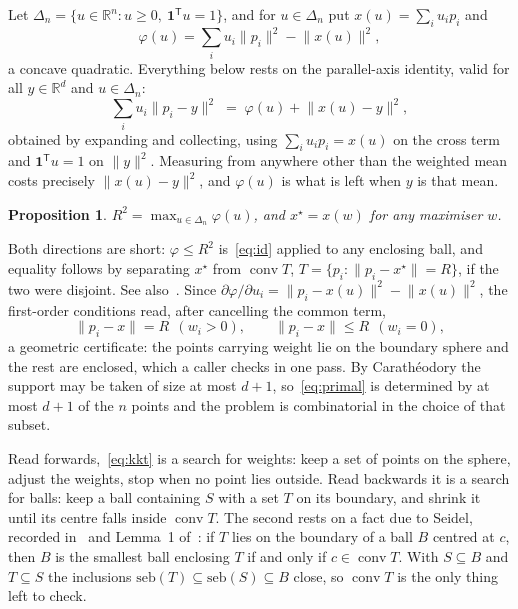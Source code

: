 \documentclass[10pt,a4paper]{article}
\theoremstyle{plain}
\newtheorem{proposition}{Proposition}
\DeclareMathOperator{\conv}{conv}
\newcommand{\R}{\mathbb{R}}
\newcommand{\norm}[1]{\lVert #1 \rVert}
\newcommand{\T}{^{\mathsf{T}}}
\begin{document}
Let $\Delta_n=\{u\in\R^n: u\ge0,\ \mathbf{1}\T u=1\}$, and for $u\in\Delta_n$ put
$x(u)=\sum_i u_ip_i$ and
\begin{equation}
  \label{eq:phi}
  \varphi(u)=\sum_i u_i\norm{p_i}^2-\norm{x(u)}^2 ,
\end{equation}
a concave quadratic. Everything below rests on the parallel-axis identity, valid
for all $y\in\R^d$ and $u\in\Delta_n$:
\begin{equation}
  \label{eq:id}
  \sum_i u_i\norm{p_i-y}^2
    \;=\; \varphi(u)+\norm{x(u)-y}^2 ,
\end{equation}
obtained by expanding and collecting, using $\sum_iu_ip_i=x(u)$ on the cross term
and $\mathbf{1}\T u=1$ on $\norm{y}^2$. Measuring from anywhere other than the
weighted mean costs precisely $\norm{x(u)-y}^2$, and $\varphi(u)$ is what is left
when $y$ is that mean.

\begin{proposition}
  \label{prop:duality}
  $R^2=\max_{u\in\Delta_n}\varphi(u)$, and $x^\star=x(w)$ for any maximiser $w$.
\end{proposition}

\noindent
Both directions are short: $\varphi\le R^2$ is~\eqref{eq:id} applied to any
enclosing ball, and equality follows by separating $x^\star$ from $\conv T$,
$T=\{p_i:\norm{p_i-x^\star}=R\}$, if the two were disjoint. See
also~\cite{gaertner2000}. Since
$\partial\varphi/\partial u_i=\norm{p_i-x(u)}^2-\norm{x(u)}^2$, the first-order
conditions read, after cancelling the common term,
\begin{equation}
  \label{eq:kkt}
  \norm{p_i-x}=R\ \ (w_i>0),\qquad \norm{p_i-x}\le R\ \ (w_i=0),
\end{equation}
a geometric certificate: the points carrying weight lie on the boundary sphere and
the rest are enclosed, which a caller checks in one pass. By Carath\'eodory the
support may be taken of size at most $d+1$, so~\eqref{eq:primal} is determined by
at most $d+1$ of the $n$ points and the problem is combinatorial in the choice of
that subset.

Read forwards,~\eqref{eq:kkt} is a search for weights: keep a set of points on the
sphere, adjust the weights, stop when no point lies outside. Read backwards it is
a search for balls: keep a ball containing $S$ with a set $T$ on its boundary, and
shrink it until its centre falls inside $\conv T$. The second rests on a fact due
to Seidel, recorded in~\cite{gaertner2000} and Lemma~1 of~\cite{fischer2003}: if
$T$ lies on the boundary of a ball $B$ centred at $c$, then $B$ is the smallest
ball enclosing $T$ if and only if $c\in\conv T$. With $S\subseteq B$ and
$T\subseteq S$ the inclusions $\mathrm{seb}(T)\subseteq\mathrm{seb}(S)\subseteq B$
close, so $\conv T$ is the only thing left to check.
\end{document}
